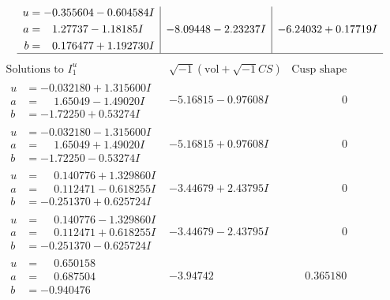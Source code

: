 \documentclass[1p]{elsarticle_modified}
\theoremstyle{definition}
\newcommand{\I}{\sqrt{-1}}
\begin{document}
$$\begin{array}{c|c|c}
\begin{aligned}
u &= -0.355604 - 0.604584 I \\
a &= \phantom{-}1.27737 - 1.18185 I \\
b &= \phantom{-}0.176477 + 1.192730 I\end{aligned}
 & -8.09448 - 2.23237 I & -6.24032 + 0.17719 I\\
 \hline 
 \end{array}$$\newpage$$\begin{array}{c|c|c}  
\text{Solutions to }I^u_{1}& \I (\text{vol} + \sqrt{-1}CS) & \text{Cusp shape}\\
 \hline 
\begin{aligned}
u &= -0.032180 + 1.315600 I \\
a &= \phantom{-}1.65049 - 1.49020 I \\
b &= -1.72250 + 0.53274 I\end{aligned}
 & -5.16815 - 0.97608 I & \phantom{-0.000000 } 0 \\ \hline\begin{aligned}
u &= -0.032180 - 1.315600 I \\
a &= \phantom{-}1.65049 + 1.49020 I \\
b &= -1.72250 - 0.53274 I\end{aligned}
 & -5.16815 + 0.97608 I & \phantom{-0.000000 } 0 \\ \hline\begin{aligned}
u &= \phantom{-}0.140776 + 1.329860 I \\
a &= \phantom{-}0.112471 - 0.618255 I \\
b &= -0.251370 + 0.625724 I\end{aligned}
 & -3.44679 + 2.43795 I & \phantom{-0.000000 } 0 \\ \hline\begin{aligned}
u &= \phantom{-}0.140776 - 1.329860 I \\
a &= \phantom{-}0.112471 + 0.618255 I \\
b &= -0.251370 - 0.625724 I\end{aligned}
 & -3.44679 - 2.43795 I & \phantom{-0.000000 } 0 \\ \hline\begin{aligned}
u &= \phantom{-}0.650158\phantom{ +0.000000I} \\
a &= \phantom{-}0.687504\phantom{ +0.000000I} \\
b &= -0.940476\phantom{ +0.000000I}\end{aligned}
 & -3.94742\phantom{ +0.000000I} & \phantom{-}0.365180\phantom{ +0.000000I} \\ \hline\begin{aligned}

\end{aligned}
\end{array}$$
\end{document}
